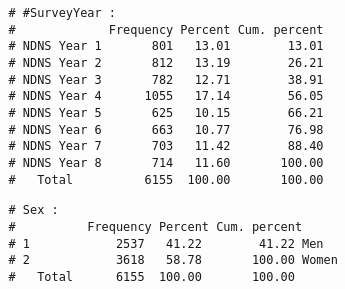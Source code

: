\begin{Shaded}
\begin{Highlighting}[]
\OperatorTok{$}\StringTok{ }\NormalTok{(}\OperatorTok{*}\OperatorTok{$}\OperatorTok{+}\OperatorTok{$}
				
\StringTok{ }\NormalTok{dfs2[}\OperatorTok{$}\OperatorTok{$}\OperatorTok{$}\NormalTok{MealMinN0),]}
				
\NormalTok{(}\OperatorTok{$}
				
				
				
\StringTok{ }\NormalTok{dfs3[}\OperatorTok{!}\OperatorTok{$}\NormalTok{id), ]}
 \NormalTok{, } \NormalTok{))}
\end{Highlighting}
\end{Shaded}
				
				\begin{verbatim}
				# #SurveyYear : 
				#             Frequency Percent Cum. percent
				# NDNS Year 1       801   13.01        13.01
				# NDNS Year 2       812   13.19        26.21
				# NDNS Year 3       782   12.71        38.91
				# NDNS Year 4      1055   17.14        56.05
				# NDNS Year 5       625   10.15        66.21
				# NDNS Year 6       663   10.77        76.98
				# NDNS Year 7       703   11.42        88.40
				# NDNS Year 8       714   11.60       100.00
				#   Total          6155  100.00       100.00
				\end{verbatim}
				
\begin{Shaded}
\begin{Highlighting}[]
						
 \NormalTok{, } \NormalTok{))}
\end{Highlighting}
\end{Shaded}
				
				\begin{verbatim}
				# Sex : 
				#          Frequency Percent Cum. percent
				# 1            2537   41.22        41.22 Men
				# 2            3618   58.78       100.00 Women
				#   Total      6155  100.00       100.00
				\end{verbatim}
				
